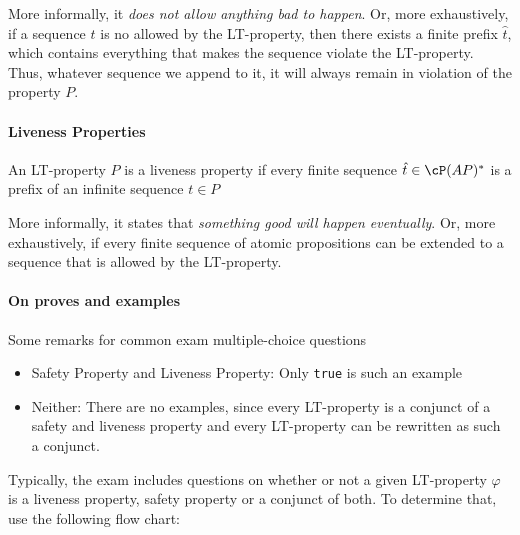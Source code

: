 \inlineintuition More informally, it \textit{does not allow anything bad to happen}. Or, more exhaustively, if a sequence $t$ is no allowed by the LT-property,
then there exists a finite prefix $\hat{t}$, which contains everything that makes the sequence violate the LT-property.
Thus, whatever sequence we append to it, it will always remain in violation of the property $P$.


\paragraph{Liveness Properties}
\inlinedefinition An LT-property $P$ is a liveness property if every finite sequence $\hat{t} \in \cP(AP)^*$ is a prefix of an infinite sequence $t \in P$

\inlineintuition More informally, it states that \textit{something good will happen eventually}.
Or, more exhaustively, if every finite sequence of atomic propositions can be extended to a sequence that is allowed by the LT-property.


\paragraph{On proves and examples}
Some remarks for common exam multiple-choice questions
\begin{itemize}
    \item Safety Property and Liveness Property: Only \texttt{true} is such an example
    \item Neither: There are no examples, since every LT-property is a conjunct of a safety and liveness property and every LT-property can be rewritten as such a conjunct.
\end{itemize}

Typically, the exam includes questions on whether or not a given LT-property $\varphi$ is a liveness property, safety property or a conjunct of both.
To determine that, use the following flow chart:
\begin{center}
\end{center}
